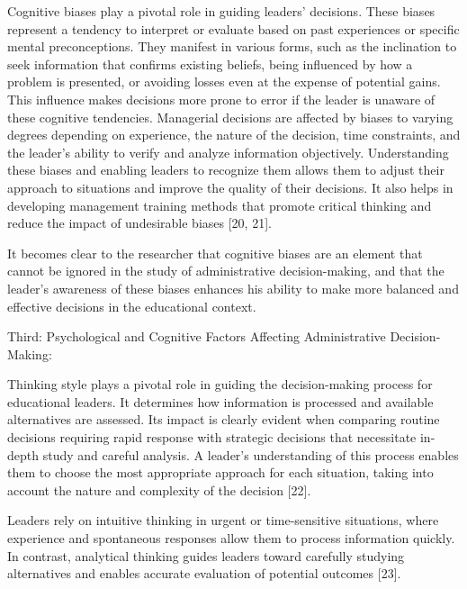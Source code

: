 \documentclass[10pt]{NSP1}
\begin{document}
\par\medskip{}\smallskip

Cognitive biases play a pivotal role in guiding leaders' decisions. These biases represent a tendency to interpret or evaluate based on past experiences or specific mental preconceptions. They manifest in various forms, such as the inclination to seek information that confirms existing beliefs, being influenced by how a problem is presented, or avoiding losses even at the expense of potential gains. This influence makes decisions more prone to error if the leader is unaware of these cognitive tendencies. Managerial decisions are affected by biases to varying degrees depending on experience, the nature of the decision, time constraints, and the leader's ability to verify and analyze information objectively. Understanding these biases and enabling leaders to recognize them allows them to adjust their approach to situations and improve the quality of their decisions. It also helps in developing management training methods that promote critical thinking and reduce the impact of undesirable biases [20, 21].

It becomes clear to the researcher that cognitive biases are an element that cannot be ignored in the study of administrative decision-making, and that the leader's awareness of these biases enhances his ability to make more balanced and effective decisions in the educational context.

Third: Psychological and Cognitive Factors Affecting Administrative Decision-Making:

\par\medskip{}\smallskip

Thinking style plays a pivotal role in guiding the decision-making process for educational leaders. It determines how information is processed and available alternatives are assessed. Its impact is clearly evident when comparing routine decisions requiring rapid response with strategic decisions that necessitate in-depth study and careful analysis. A leader's understanding of this process enables them to choose the most appropriate approach for each situation, taking into account the nature and complexity of the decision [22].

Leaders rely on intuitive thinking in urgent or time-sensitive situations, where experience and spontaneous responses allow them to process information quickly. In contrast, analytical thinking guides leaders toward carefully studying alternatives and enables accurate evaluation of potential outcomes [23].
\end{document}
